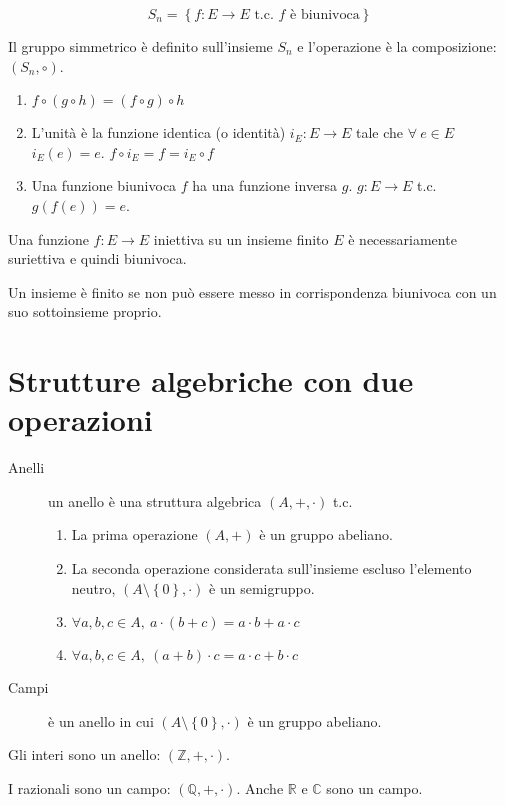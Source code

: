 \[
S_n = \left\{ f : E \to E \text{ t.c. $f$ \`e biunivoca} \right\}
\]

Il gruppo simmetrico \`e definito sull'insieme $S_n$ e l'operazione \`e la composizione: $\left( S_n, \circ \right)$.
\begin{enumerate}
    \item $f \circ \left( g \circ h \right) = \left( f \circ g \right) \circ h$ 
    \item L'unit\`a \`e la funzione identica (o identit\`a) $i_E : E \to E$ tale che $\forall \ e \in E $ $i_E(e) = e$. $f \circ i_E = f = i_E \circ f$ 
    \item Una funzione biunivoca $f$ ha una funzione inversa $g$. $g : E \to E $ t.c. $ g(f(e)) = e$.
\end{enumerate}

Una funzione $f : E \to E $ iniettiva su un insieme finito $E$ \`e necessariamente suriettiva e quindi biunivoca.

Un insieme \`e finito se non pu\`o essere messo in corrispondenza biunivoca con un suo sottoinsieme proprio.


\section{Strutture algebriche con due operazioni}

\begin{description}
    \item[Anelli] un anello \`e una struttura algebrica $(A, +, \cdot)$ t.c. 
    \begin{enumerate}
        \item La prima operazione $\left( A, + \right )$ \`e un gruppo abeliano.
        \item La seconda operazione considerata sull'insieme escluso l'elemento neutro, $(A \setminus \left \{ 0 \right \}, \cdot )$ \`e un semigruppo.
        \item $ \forall a, b, c \in A , \ a \cdot (b + c) = a \cdot b + a \cdot c $
        \item $ \forall a, b, c \in A , \ (a + b) \cdot c = a \cdot c + b \cdot c $
    \end{enumerate}
    \item[Campi] \`e un anello in cui $( A \setminus \left \{ 0 \right \}, \cdot )$ \`e un gruppo abeliano.
\end{description}

Gli interi sono un anello: $\left ( \mathbb{Z}, +, \cdot \right )$.

I razionali sono un campo: $\left ( \mathbb{Q}, +, \cdot \right )$. Anche $\mathbb{R}$ e $\mathbb{C}$ sono un campo.
